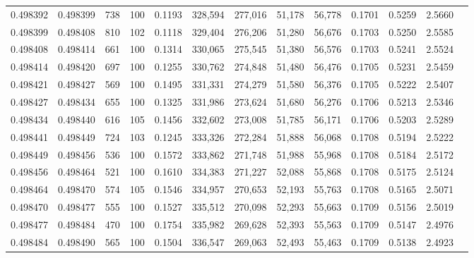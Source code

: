 \begin{tabular}{rrrrrrrrrrrrr}
0.498392 & 0.498399 &   738 & 100 &                                     0.1193 & 328,594 & 277,016 &  51,178 &  56,778 & 0.1701 & 0.5259 & 2.5660 \\
0.498399 & 0.498408 &   810 & 102 &                                     0.1118 & 329,404 & 276,206 &  51,280 &  56,676 & 0.1703 & 0.5250 & 2.5585 \\
0.498408 & 0.498414 &   661 & 100 &                                     0.1314 & 330,065 & 275,545 &  51,380 &  56,576 & 0.1703 & 0.5241 & 2.5524 \\
0.498414 & 0.498420 &   697 & 100 &                                     0.1255 & 330,762 & 274,848 &  51,480 &  56,476 & 0.1705 & 0.5231 & 2.5459 \\
0.498421 & 0.498427 &   569 & 100 &                                     0.1495 & 331,331 & 274,279 &  51,580 &  56,376 & 0.1705 & 0.5222 & 2.5407 \\
0.498427 & 0.498434 &   655 & 100 &                                     0.1325 & 331,986 & 273,624 &  51,680 &  56,276 & 0.1706 & 0.5213 & 2.5346 \\
0.498434 & 0.498440 &   616 & 105 &                                     0.1456 & 332,602 & 273,008 &  51,785 &  56,171 & 0.1706 & 0.5203 & 2.5289 \\
0.498441 & 0.498449 &   724 & 103 &                                     0.1245 & 333,326 & 272,284 &  51,888 &  56,068 & 0.1708 & 0.5194 & 2.5222 \\
0.498449 & 0.498456 &   536 & 100 &                                     0.1572 & 333,862 & 271,748 &  51,988 &  55,968 & 0.1708 & 0.5184 & 2.5172 \\
0.498456 & 0.498464 &   521 & 100 &                                     0.1610 & 334,383 & 271,227 &  52,088 &  55,868 & 0.1708 & 0.5175 & 2.5124 \\
0.498464 & 0.498470 &   574 & 105 &                                     0.1546 & 334,957 & 270,653 &  52,193 &  55,763 & 0.1708 & 0.5165 & 2.5071 \\
0.498470 & 0.498477 &   555 & 100 &                                     0.1527 & 335,512 & 270,098 &  52,293 &  55,663 & 0.1709 & 0.5156 & 2.5019 \\
0.498477 & 0.498484 &   470 & 100 &                                     0.1754 & 335,982 & 269,628 &  52,393 &  55,563 & 0.1709 & 0.5147 & 2.4976 \\
0.498484 & 0.498490 &   565 & 100 &                                     0.1504 & 336,547 & 269,063 &  52,493 &  55,463 & 0.1709 & 0.5138 & 2.4923 \\

\end{tabular}
